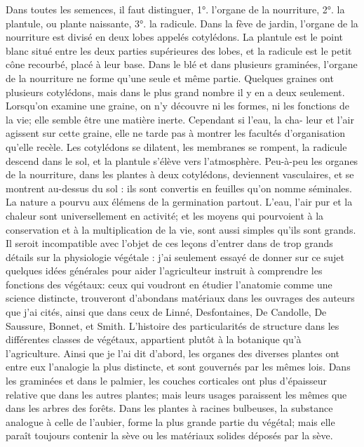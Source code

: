 Dans toutes les semences, il faut distinguer, 1°. l'organe de la nourriture, 2°. la plantule, ou plante naissante, 3°. la radicule.
Dans la fève de jardin, l'organe de la nourriture est divisé en deux lobes appelés cotylédons. La plantule est le point blanc situé entre les deux parties supérieures des lobes, et la radicule est le petit cône recourbé, placé à leur base.
Dans le blé et dans plusieurs graminées, l'organe de la nourriture ne forme qu'une seule et même partie. Quelques graines ont plusieurs cotylédons, mais dans le plus grand nombre il y en a deux seulement. Lorsqu'on examine une graine, on n'y découvre ni les formes, ni les fonctions de la vie; elle semble être une matière inerte. Cependant si l'eau, la cha-\setcounter{page}{391} leur et l'air agissent sur cette graine, elle ne tarde pas à montrer les facultés d'organisation qu'elle recèle. Les cotylédons se dilatent, les membranes se rompent, la radicule descend dans le sol, et la plantule s'élève vers l'atmosphère. Peu-à-peu les organes de la nourriture, dans les plantes à deux cotylédons, deviennent vasculaires, et se montrent au-dessus du sol : ils sont convertis en feuilles qu'on nomme séminales. La nature a pourvu aux élémens de la germination partout. L'eau, l'air pur et la chaleur sont universellement en activité; et les moyens qui pourvoient à la conservation et à la multiplication de la vie, sont aussi simples qu'ils sont grands.
Il seroit incompatible avec l'objet de ces leçons d'entrer dans de trop grands détails sur la physiologie végétale : j'ai seulement essayé de donner sur ce sujet quelques idées générales pour aider l'agriculteur instruit à comprendre les fonctions des végétaux: ceux qui voudront en étudier l'anatomie comme une science distincte, trouveront d'abondans matériaux dans les ouvrages des auteurs que j'ai cités, ainsi que dans ceux de Linné, Desfontaines, De Candolle, De Saussure, Bonnet, et Smith.\setcounter{page}{392} L'histoire des particularités de structure dans les différentes classes de végétaux, appartient plutôt à la botanique qu'à l'agriculture. Ainsi que je l'ai dit d'abord, les organes des diverses plantes ont entre eux l'analogie la plus distincte, et sont gouvernés par les mêmes lois. Dans les graminées et dans le palmier, les couches corticales ont plus d'épaisseur relative que dans les autres plantes; mais leurs usages paraissent les mêmes que dans les arbres des forêts.
Dans les plantes à racines bulbeuses, la substance analogue à celle de l'aubier, forme la plus grande partie du végétal; mais elle paraît toujours contenir la sève ou les matériaux solides déposés par la sève.

